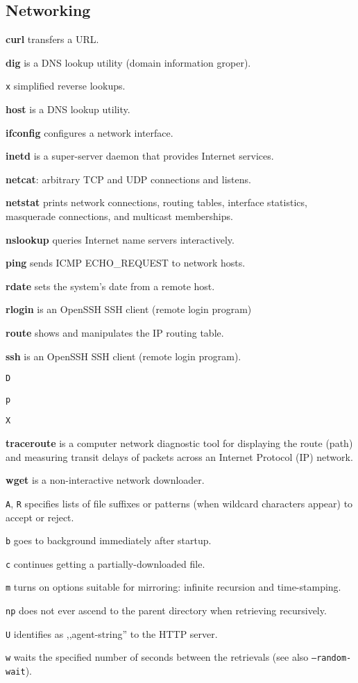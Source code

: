 \subsection{Networking}
\textbf{curl} transfers a URL.

\textbf{dig} is a DNS lookup utility (domain information groper).
\begin{enumx}
	\item [\texttt{x}] simplified reverse lookups.
\end{enumx}

\textbf{host} is a DNS lookup utility.

\textbf{ifconfig} configures a network interface.

\textbf{inetd} is a super-server daemon that provides Internet services.

\textbf{netcat}: arbitrary TCP and UDP connections and listens.

\textbf{netstat} prints network connections, routing tables, 
interface statistics, masquerade connections, and multicast memberships.

\textbf{nslookup} queries Internet name servers interactively.

\textbf{ping} sends ICMP ECHO\_REQUEST to network hosts.

\textbf{rdate} sets the system's date from a remote host.

\textbf{rlogin} is an OpenSSH SSH client (remote login program)

\textbf{route} shows and manipulates the IP routing table.

\textbf{ssh} is an OpenSSH SSH client (remote login program).
\begin{enumx}
	\item [\texttt{D}]
	\item [\texttt{p}]
	\item [\texttt{X}]
\end{enumx}

\textbf{traceroute} is a computer network diagnostic tool for 
displaying the route (path) and measuring transit delays of 
packets across an Internet Protocol (IP) network.

\textbf{wget} is a non-interactive network downloader.
\begin{enumx}
	\item [\texttt{A}, \texttt{R}] specifies lists 	of file suffixes or 
	patterns (when wildcard characters appear) to accept or reject.
	\item [\texttt{b}] goes to background immediately after startup.
	\item [\texttt{c}] continues getting a partially-downloaded file.
	\item [\texttt{m}] turns on options suitable for mirroring: infinite recursion and time-stamping.
	\item [\texttt{np}] does not ever ascend to the parent directory when retrieving recursively.
	\item [\texttt{U}] identifies as ,,agent-string'' to the HTTP server.
	\item [\texttt{w}] waits the specified number of seconds between the retrievals (see also \texttt{--random-wait}).
\end{enumx}